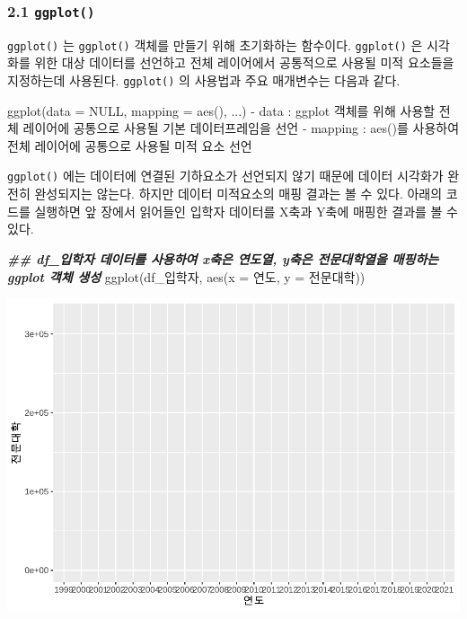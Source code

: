 \documentclass[
]{article}
\newenvironment{Shaded}{\begin{snugshade}}{\end{snugshade}}
\newcommand{\AttributeTok}[1]{\textcolor[rgb]{0.77,0.63,0.00}{#1}}
\newcommand{\ConstantTok}[1]{\textcolor[rgb]{0.00,0.00,0.00}{#1}}
\newcommand{\DocumentationTok}[1]{\textcolor[rgb]{0.56,0.35,0.01}{\textbf{\textit{#1}}}}
\newcommand{\FunctionTok}[1]{\textcolor[rgb]{0.00,0.00,0.00}{#1}}
\newcommand{\NormalTok}[1]{#1}
\newcommand{\SpecialCharTok}[1]{\textcolor[rgb]{0.00,0.00,0.00}{#1}}
\newcommand{\StringTok}[1]{\textcolor[rgb]{0.31,0.60,0.02}{#1}}
\begin{document}
\hypertarget{ggplot}{%
\subsubsection{\texorpdfstring{2.1 \texttt{ggplot()}}{2.1 ggplot()}}\label{ggplot}}

\texttt{ggplot()} 는 \texttt{ggplot()} 객체를 만들기 위해 초기화하는 함수이다. \texttt{ggplot()} 은 시각화를 위한 대상 데이터를 선언하고 전체 레이어에서 공통적으로 사용될 미적 요소들을 지정하는데 사용된다. \texttt{ggplot()} 의 사용법과 주요 매개변수는 다음과 같다.

\begin{Shaded}
\begin{Highlighting}[]
\FunctionTok{ggplot}\NormalTok{(}\AttributeTok{data =} \ConstantTok{NULL}\NormalTok{, }\AttributeTok{mapping =} \FunctionTok{aes}\NormalTok{(), ...)}
  \SpecialCharTok{{-}}\NormalTok{ data }\SpecialCharTok{:}\NormalTok{ ggplot 객체를 위해 사용할 전체 레이어에 공통으로 사용될 기본 데이터프레임을 선언}
\StringTok{\textasciigrave{}}\AttributeTok{{-} mapping : aes()를 사용하여 전체 레이어에 공통으로 사용될 미적 요소 선언}
\end{Highlighting}
\end{Shaded}

\texttt{ggplot()} 에는 데이터에 연결된 기하요소가 선언되지 않기 때문에 데이터 시각화가 완전히 완성되지는 않는다. 하지만 데이터 미적요소의 매핑 결과는 볼 수 있다. 아래의 코드를 실행하면 앞 장에서 읽어들인 입학자 데이터를 X축과 Y축에 매핑한 결과를 볼 수 있다.

\begin{Shaded}
\begin{Highlighting}[]
\DocumentationTok{\#\# df\_입학자 데이터를 사용하여 x축은 연도열, y축은 전문대학열을 매핑하는 ggplot 객체 생성}
\FunctionTok{ggplot}\NormalTok{(df\_입학자, }\FunctionTok{aes}\NormalTok{(}\AttributeTok{x =}\NormalTok{ 연도, }\AttributeTok{y =}\NormalTok{ 전문대학))}
\end{Highlighting}
\end{Shaded}

\includegraphics{chap3_files/figure-latex/unnamed-chunk-3-1.pdf}
\end{document}
